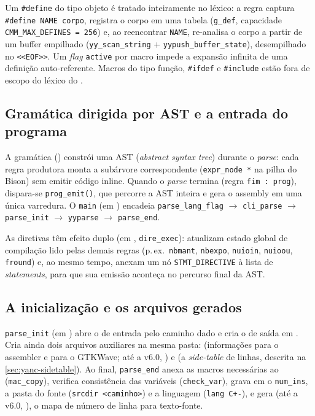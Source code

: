 Um \lstinline|#define| do tipo objeto é tratado inteiramente no léxico: a regra
captura \lstinline|#define NAME corpo|, registra o corpo em uma tabela
(\lstinline|g_def|, capacidade \lstinline|CMM_MAX_DEFINES = 256|) e, ao reencontrar
\lstinline|NAME|, re-analisa o corpo a partir de um buffer empilhado
(\lstinline|yy_scan_string| + \lstinline|yypush_buffer_state|), desempilhado no
\lstinline|<<EOF>>|. Um \emph{flag} \lstinline|active| por macro impede a expansão
infinita de uma definição auto-referente. Macros do tipo função, \lstinline|#ifdef|
e \lstinline|#include| estão fora de escopo do léxico do \cmm{}.

\subsection{Gramática dirigida por AST e a entrada do programa}
\label{sec:yanc-cmmcomp-ast}

A gramática () constrói uma AST (\emph{abstract syntax tree})
durante o \emph{parse}: cada regra produtora monta a subárvore correspondente
(\lstinline|expr_node *| na pilha do Bison) sem emitir código inline. Quando o
\emph{parse} termina (regra \lstinline|fim : prog|), dispara-se
\lstinline|prog_emit()|, que percorre a AST inteira e gera o assembly em uma única
varredura. O \lstinline|main| (em ) encadeia
\lstinline|parse_lang_flag| $\rightarrow$ \lstinline|cli_parse| $\rightarrow$
\lstinline|parse_init| $\rightarrow$ \lstinline|yyparse| $\rightarrow$
\lstinline|parse_end|.

As diretivas têm efeito duplo (em , \lstinline|dire_exec|):
atualizam estado global de compilação lido pelas demais regras
(p.\,ex.\ \lstinline|nbmant|, \lstinline|nbexpo|, \lstinline|nuioin|,
\lstinline|nuioou|, \lstinline|fround|) e, ao mesmo tempo, anexam um nó
\lstinline|STMT_DIRECTIVE| à lista de \emph{statements}, para que sua emissão
aconteça no percurso final da AST.

\subsection{A inicialização e os arquivos gerados}
\label{sec:yanc-cmmcomp-init}

\lstinline|parse_init| (em ) abre o  de entrada pelo
caminho dado e cria o  de saída em . Cria
ainda dois arquivos auxiliares na mesma pasta:  (informações
para o assembler e para o GTKWave; até a v6.0, ) e
 (a \emph{side-table} de linhas, descrita na
\autoref{sec:yanc-sidetable}). Ao final, \lstinline|parse_end| anexa as macros
necessárias ao  (\lstinline|mac_copy|), verifica consistência das
variáveis (\lstinline|check_var|), grava em  o
\lstinline|num_ins|, a pasta do fonte (\lstinline|srcdir <caminho>|) e a
linguagem (\lstinline|lang C+-|), e gera  (até a v6.0,
), o mapa de número de linha para texto-fonte.

